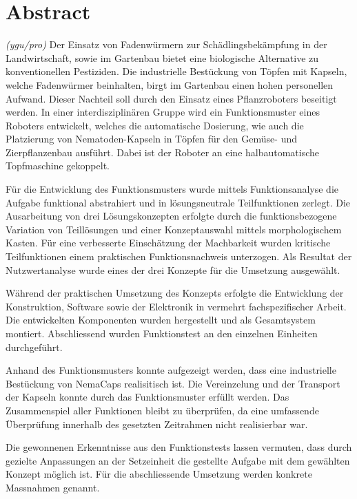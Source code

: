 \newpage
\section{Abstract}
\textit{(ygu/pro)} Der Einsatz von Fadenwürmern zur Schädlingsbekämpfung in der Landwirtschaft, sowie im Gartenbau bietet eine biologische Alternative zu konventionellen Pestiziden. Die industrielle Bestückung von Töpfen mit Kapseln, welche Fadenwürmer beinhalten, birgt im Gartenbau einen hohen personellen Aufwand. Dieser Nachteil soll durch den Einsatz eines Pflanzroboters beseitigt werden. In einer interdisziplinären Gruppe wird  ein Funktionsmuster eines Roboters entwickelt, welches die automatische Dosierung, wie auch die Platzierung von Nematoden-Kapseln in Töpfen für den Gemüse- und Zierpflanzenbau ausführt. Dabei ist der Roboter an eine halbautomatische Topfmaschine gekoppelt.
\newline

Für die Entwicklung des Funktionsmusters wurde mittels Funktionsanalyse die Aufgabe funktional abstrahiert und in lösungsneutrale Teilfunktionen zerlegt. Die Ausarbeitung von drei Lösungskonzepten erfolgte durch die funktionsbezogene Variation von Teillösungen und einer Konzeptauswahl mittels morphologischem Kasten. Für eine verbesserte Einschätzung der Machbarkeit wurden kritische Teilfunktionen einem praktischen Funktionsnachweis unterzogen. Als Resultat der Nutzwertanalyse wurde eines der drei Konzepte für die Umsetzung ausgewählt.
\newline

Während der praktischen Umsetzung des Konzepts erfolgte die Entwicklung der Konstruktion, Software sowie der Elektronik in vermehrt fachspezifischer Arbeit. Die entwickelten Komponenten wurden hergestellt und als Gesamtsystem montiert. Abschliessend wurden Funktionstest an den einzelnen Einheiten durchgeführt.
\newline

Anhand des Funktionsmusters konnte aufgezeigt werden, dass eine industrielle Bestückung von NemaCaps realisitisch ist. Die Vereinzelung und der Transport der Kapseln konnte durch das Funktionsmuster erfüllt werden. Das Zusammenspiel aller Funktionen bleibt zu überprüfen, da eine umfassende Überprüfung innerhalb des gesetzten Zeitrahmen nicht realisierbar war.
\newline

Die gewonnenen Erkenntnisse aus den Funktionstests lassen vermuten, dass durch gezielte Anpassungen an der Setzeinheit die gestellte Aufgabe mit dem gewählten Konzept möglich ist. Für die abschliessende Umsetzung werden konkrete Massnahmen genannt.

